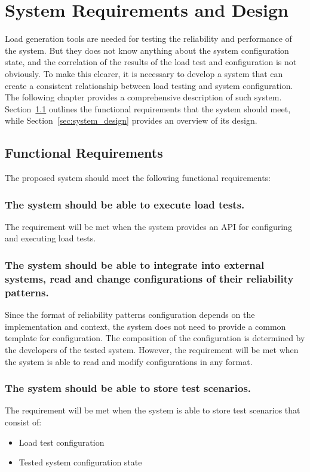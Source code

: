 \graphicspath{{figs/}} %


\chapter{System Requirements and Design}
\label{ch:design}

Load generation tools are needed for testing the reliability and performance of the system. But they does not know anything about the system configuration state, and the correlation of the results of the load test and configuration is not obviously. To make this clearer, it is necessary to develop a system that can create a consistent relationship between load testing and system configuration. The following chapter provides a comprehensive description of such system. Section~\ref{sec:functional-requirements} outlines the functional requirements that the system should meet, while Section~\ref{sec:system_design} provides an overview of its design.


\section{Functional Requirements}\label{sec:functional-requirements}
The proposed system should meet the following functional requirements:

\subsection{The system should be able to execute load tests.}\label{subsec:fr:execute_load_test}
The requirement will be met when the system provides an API for configuring and executing load tests.

\subsection{The system should be able to integrate into external systems, read and change configurations of their reliability patterns.}\label{subsec:fr:integrate}
Since the format of reliability patterns configuration depends on the implementation and context, the system does not need to provide a common template for configuration. The composition of the configuration is determined by the developers of the tested system. However, the requirement will be met when the system is able to read and modify configurations in any format.

\subsection{The system should be able to store test scenarios.}\label{subsec:fr:store_scenarios}
The requirement will be met when the system is able to store test scenarios that consist of:
\begin{itemize}
    \item Load test configuration
    \item Tested system configuration state
\end{itemize}

